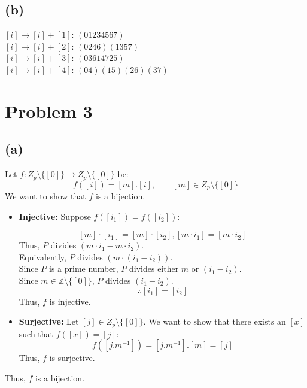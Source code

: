 \documentclass{article}
\begin{document}
\subsection*{(b)}
\([i] \rightarrow [i] + [1]\):
\(
   (01234567)
\)
\\
\([i] \rightarrow [i] + [2]\):
\(
   (0246)(1357)
\)
\\
\([i] \rightarrow [i] + [3]\):
\(
   (03614725)
\)
\\
\([i] \rightarrow [i] + [4]\):
\(
   (04)(15)(26)(37)
\)

\section*{Problem 3}


\subsection*{(a)}

Let \(f: Z_p \setminus \{[0]\} \to Z_p \setminus \{[0]\}\) be:
\[
   f([i]) = [m].[i], \qquad [m] \in Z_p \setminus \{[0]\}
\]
We want to show that \(f\) is a bijection.
\begin{itemize}
   \item \textbf{Injective:} Suppose \(f([i_1]) = f([i_2])\):
   
   \[
      [m]\cdot[i_1] = [m]\cdot[i_2], [m\cdot i_1] = [m\cdot i_2]
   \]
   Thus, $P$ divides $(m\cdot i_1-m\cdot i_2)$.
   \\ Equivalently, $P$ divides $(m\cdot (i_1- i_2))$. 
   \\ Since $P$ is a prime number, $P$ divides either $m$ or $(i_1 -i_2)$.
   \\ Since $m\in \mathbb{Z} \setminus \{[0]\} $, $P$ divides $(i_1 -i_2)$.
   \[
     \therefore [i_1] = [i_2]
   \]
   Thus, \(f\) is injective.
   \item \textbf{Surjective:} Let \([j] \in Z_p \setminus \{[0]\}\). We want to show that there exists an \([x]\) such that \(f([x]) = [j]\):
   \[
      f([j . m^{-1}]) = [j . m^{-1}] . [m] = [j]
   \]
   Thus, \(f\) is surjective.
\end{itemize}
Thus, \(f\) is a bijection.
\end{document}
